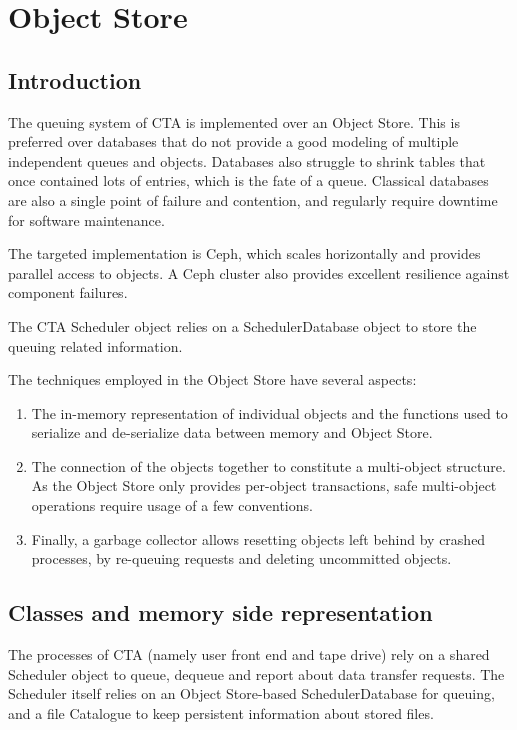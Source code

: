 \chapter{Object Store}

\section{Introduction}

The queuing system of CTA is implemented over an Object Store. This is preferred over databases that do not provide a
good modeling of multiple independent queues and objects. Databases also struggle to shrink tables that once contained
lots of entries, which is the fate of a queue. Classical databases are also a single point of failure and contention,
and regularly require downtime for software maintenance.

The targeted implementation is Ceph, which scales horizontally and provides parallel access to objects. A Ceph cluster
also provides excellent resilience against component failures.

The CTA Scheduler object relies on a SchedulerDatabase object to store the queuing related information.

The techniques employed in the Object Store have several aspects:
\begin{enumerate}
\item The in-memory representation of individual objects and the functions used to serialize and de-serialize data
      between memory and Object Store.
\item The connection of the objects together to constitute a multi-object structure. As the Object Store only provides
      per-object transactions, safe multi-object operations require usage of a few conventions.
\item Finally, a garbage collector allows resetting objects left behind by crashed processes, by re-queuing requests
      and deleting uncommitted objects.
\end{enumerate}

\section{Classes and memory side representation}

The processes of CTA (namely user front end and tape drive) rely on a shared Scheduler object to queue, dequeue and
report about data transfer requests. The Scheduler itself relies on an Object Store-based SchedulerDatabase for
queuing, and a file Catalogue to keep persistent information about stored files.

